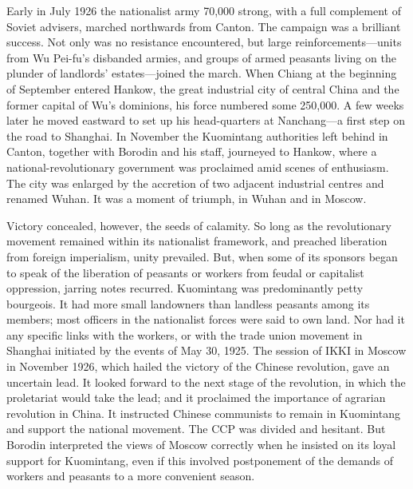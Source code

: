 Early in July 1926 the nationalist army 70,000 strong, with a full complement of Soviet advisers, marched northwards from Canton. The campaign was a brilliant success. Not only was no resistance encountered, but large reinforcements---units from Wu Pei-fu's disbanded armies, and groups of armed peasants living on the plunder of landlords' estates---joined the march. When Chiang at the beginning of September entered Hankow, the great industrial city of central China and the former capital of Wu's dominions, his force numbered some 250,000. A few weeks later he moved eastward to set up his head-quarters at Nanchang---a first step on the road to Shanghai. In November the Kuomintang authorities left behind in Canton, together with Borodin and his staff, journeyed to Hankow, where a national-revolutionary government was proclaimed amid scenes of enthusiasm. The city was enlarged by the accretion of two adjacent industrial centres and renamed Wuhan. It was a moment of triumph, in Wuhan and in Moscow. 

Victory concealed, however, the seeds of calamity. So long as the revolutionary movement remained within its nationalist framework, and preached liberation from foreign imperialism, unity prevailed. But, when some of its sponsors began to speak of the liberation of peasants or workers from feudal or capitalist oppression, jarring notes recurred. Kuomintang was predominantly petty bourgeois. It had more small landowners than landless peasants among its members; most officers in the nationalist forces were said to own land. Nor had it any specific links with the workers, or with the trade union movement in Shanghai initiated by the events of May 30, 1925. The session of IKKI in Moscow in November 1926, which hailed the victory of the Chinese revolution, gave an uncertain lead. It looked forward to the next stage of the revolution, in which the proletariat would take the lead; and it proclaimed the importance of agrarian revolution in China. It instructed Chinese communists to remain in Kuomintang and support the national movement. The CCP was divided and hesitant. But Borodin interpreted the views of Moscow correctly when he insisted on its loyal support for Kuomintang, even if this involved postponement of the demands of workers and peasants to a more convenient season. 

